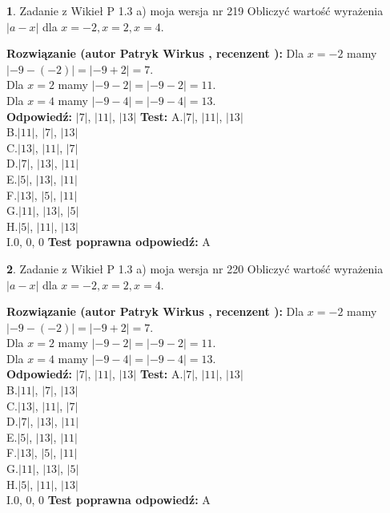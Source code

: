 \documentclass[12pt, a4paper]{article}
\theoremstyle{definition} %
\newtheorem{zad}{}
\newcommand{\zadStart}[1]{\begin{zad}#1\newline}
\newcommand{\zadStop}{\end{zad}}
\newcommand{\rozwStart}[2]{\noindent \textbf{Rozwiązanie (autor #1 , recenzent #2): }\newline}
\newcommand{\rozwStop}{\newline}
\newcommand{\odpStart}{\noindent \textbf{Odpowiedź:}\newline}
\newcommand{\odpStop}{\newline}
\newcommand{\testStart}{\noindent \textbf{Test:}\newline}
\newcommand{\testStop}{\newline}
\newcommand{\kluczStart}{\noindent \textbf{Test poprawna odpowiedź:}\newline}
\newcommand{\kluczStop}{\newline}
\begin{document}
\zadStart{Zadanie z Wikieł P 1.3 a) moja wersja nr 219}
Obliczyć wartość wyrażenia $|a - x|$ dla $x=-2,x=2,x=4$.
\zadStop
\rozwStart{Patryk Wirkus}{}
Dla $x = -2$ mamy $|-9 - (-2)| = |-9 + 2| = 7$.\\
Dla $x = 2$ mamy $|-9 - 2| = |-9 - 2| = 11$.\\
Dla $x = 4$ mamy $|-9 - 4| = |-9 - 4| = 13$.\\
\rozwStop
\odpStart
$|7|$, $|11|$, $|13|$
\odpStop
\testStart
A.$|7|$, $|11|$, $|13|$\\
B.$|11|$, $|7|$, $|13|$\\
C.$|13|$, $|11|$, $|7|$\\
D.$|7|$, $|13|$, $|11|$\\
E.$|5|$, $|13|$, $|11|$\\
F.$|13|$, $|5|$, $|11|$\\
G.$|11|$, $|13|$, $|5|$\\
H.$|5|$, $|11|$, $|13|$\\
I.$0$, $0$, $0$
\testStop
\kluczStart
A
\kluczStop



\zadStart{Zadanie z Wikieł P 1.3 a) moja wersja nr 220}
Obliczyć wartość wyrażenia $|a - x|$ dla $x=-2,x=2,x=4$.
\zadStop
\rozwStart{Patryk Wirkus}{}
Dla $x = -2$ mamy $|-9 - (-2)| = |-9 + 2| = 7$.\\
Dla $x = 2$ mamy $|-9 - 2| = |-9 - 2| = 11$.\\
Dla $x = 4$ mamy $|-9 - 4| = |-9 - 4| = 13$.\\
\rozwStop
\odpStart
$|7|$, $|11|$, $|13|$
\odpStop
\testStart
A.$|7|$, $|11|$, $|13|$\\
B.$|11|$, $|7|$, $|13|$\\
C.$|13|$, $|11|$, $|7|$\\
D.$|7|$, $|13|$, $|11|$\\
E.$|5|$, $|13|$, $|11|$\\
F.$|13|$, $|5|$, $|11|$\\
G.$|11|$, $|13|$, $|5|$\\
H.$|5|$, $|11|$, $|13|$\\
I.$0$, $0$, $0$
\testStop
\kluczStart
A
\kluczStop
\end{document}

